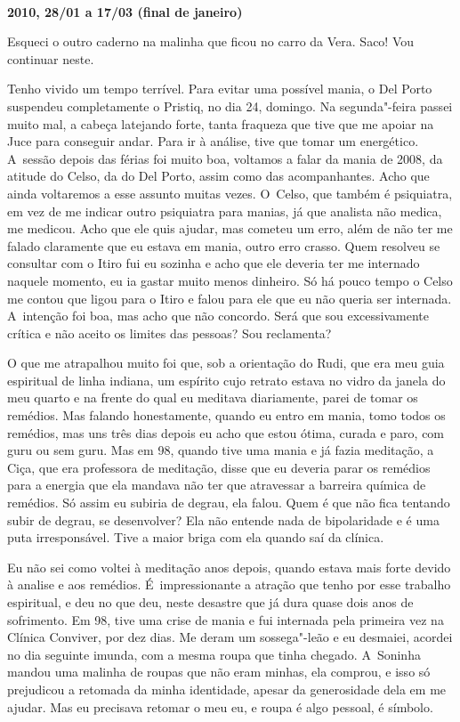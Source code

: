  

​

\begin{flushright}\textbf{2010, 28/01 a 17/03 (final de janeiro)}\end{flushright}


Esqueci o outro caderno na malinha que ficou no carro da Vera. Saco! Vou
continuar neste.

Tenho vivido um tempo terrível. Para evitar uma possível mania, o Del
Porto suspendeu completamente o Pristiq, no dia 24, domingo. Na
segunda"-feira passei muito mal, a cabeça latejando forte, tanta fraqueza
que tive que me apoiar na Juce para conseguir andar. Para ir à análise,
tive que tomar um energético. A~sessão depois das férias foi muito boa,
voltamos a falar da mania de 2008, da atitude do Celso, da do Del Porto,
assim como das acompanhantes. Acho que ainda voltaremos a esse assunto
muitas vezes. O~Celso, que também é psiquiatra, em vez de me indicar
outro psiquiatra para manias, já que analista não medica, me medicou.
Acho que ele quis ajudar, mas cometeu um erro, além de não ter me falado
claramente que eu estava em mania, outro erro crasso. Quem resolveu se
consultar com o Itiro fui eu sozinha e acho que ele deveria ter me
internado naquele momento, eu ia gastar muito menos dinheiro. Só há
pouco tempo o Celso me contou que ligou para o Itiro e falou para ele
que eu não queria ser internada. A~intenção foi boa, mas acho que não
concordo. Será que sou excessivamente crítica e não aceito os limites
das pessoas? Sou reclamenta?

O que me atrapalhou muito foi que, sob a orientação do Rudi, que era meu
guia espiritual de linha indiana, um espírito cujo retrato estava no
vidro da janela do meu quarto e na frente do qual eu meditava
diariamente, parei de tomar os remédios. Mas falando honestamente,
quando eu entro em mania, tomo todos os remédios, mas uns três dias
depois eu acho que estou ótima, curada e paro, com guru ou sem guru. Mas
em 98, quando tive uma mania e já fazia meditação, a Ciça, que era
professora de meditação, disse que eu deveria parar os remédios para a
energia que ela mandava não ter que atravessar a barreira química de
remédios. Só assim eu subiria de degrau, ela falou. Quem é que não fica
tentando subir de degrau, se desenvolver? Ela não entende nada de
bipolaridade e é uma puta irresponsável. Tive a maior briga com ela
quando saí da clínica.

Eu não sei como voltei à meditação anos depois, quando estava mais forte
devido à analise e aos remédios. É~impressionante a atração que tenho
por esse trabalho espiritual, e deu no que deu, neste desastre que já
dura quase dois anos de sofrimento. Em 98, tive uma crise de mania e fui
internada pela primeira vez na Clínica Conviver, por dez dias. Me deram
um sossega"-leão e eu desmaiei, acordei no dia seguinte imunda, com a
mesma roupa que tinha chegado. A~Soninha mandou uma malinha de roupas
que não eram minhas, ela comprou, e isso só prejudicou a retomada da
minha identidade, apesar da generosidade dela em me ajudar. Mas eu
precisava retomar o meu eu, e roupa é algo pessoal, é símbolo.

